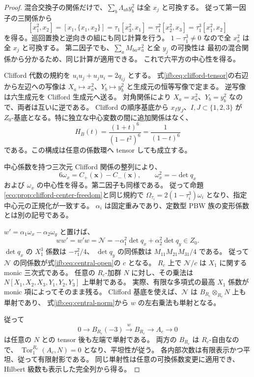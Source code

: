 \begin{proof}
混合交換子の関係だけで、$\sum_b\Lambda_{ab}y_b^2$ は全 $x_j$ と可換する。
従って第一因子の三関係から
\[
 [x_1^2,x_2]=[x_1,\{x_1,x_2\}]
    =\tau_1[x_3^2,x_1]
    =\tau_1^2[x_2^2,x_3]
    =\tau_1^3[x_1^2,x_2]
\]
を得る。巡回置換と逆向きの組にも同じ計算を行う。
$1-\tau_1^3\ne0$ なので全 $x_a^2$ は全 $x_j$ と可換する。
第二因子でも、$\sum_aM_{ba}x_a^2$ と全 $y_j$ の可換性は
最初の混合関係から分かるため、同じ計算が適用できる。
これで六平方の中心性を得る。

Clifford 代数の規約を $u_i u_j+u_j u_i=2q_{ij}$ とする。
式\eqref{ifb:eq:clifford-tensor}の右辺から左辺への写像は
$X_a\mapsto x_a^2$、$Y_b\mapsto y_b^2$ と生成元の恒等写像で定まる。
逆写像は六生成元を Clifford 生成元へ送る。
対角関係により $X_a=x_a^2$、$Y_b=y_b^2$ なので、両者は互いに逆である。
Clifford の順序基底から $x_Iy_J$、$I,J\subset\{1,2,3\}$ が
$Z_0$-基底となる。特に独立な中心変数の間に追加関係はなく、
\[
 H_B(t)=\frac{(1+t)^6}{(1-t^2)^6}=\frac1{(1-t)^6}
\]
である。この構成は任意の係数環へ tensor しても成立する。

中心係数を持つ三次元 Clifford 関係の整列により、
\[
 6\omega_x=C_+(\mathbf x)-C_-(\mathbf x),\qquad
 \omega_x^2=-\det q_x
\]
および $\omega_x$ の中心性を得る。第二因子も同様である。
従って命題\ref{eco:prop:clifford-center-freedom}と同じ規約で
$\Omega_{\tau_i}=2(1-\tau_i^3)\omega_i$ となり、指定中心元の正規化が一致する。
$\alpha_i$ は固定重みであり、定数型 PBW 族の変形係数とは別の記号である。

$w'=\alpha_1\omega_x-\alpha_2\omega_y$ と置けば、
\begin{equation}\label{ifb:eq:central-norm}
 ww'=w'w=\mathcal N=-\alpha_1^2\det q_x+\alpha_2^2\det q_y\in Z_0.
\end{equation}
$\det q_x$ の $X_1^3$ 係数は $-\tau_1^2/4$、
$\det q_y$ の同係数は $M_{11}M_{21}M_{31}/4$ である。
従って $\mathcal N$ の同係数が式\eqref{ifb:eq:central-open}の $c$ となる。
$R_c$ 上で $\mathcal N/c$ は $X_1$ に関する monic 三次式である。
任意の $R_c$-加群 $N$ に対し、その乗法は
$N[X_1,X_2,X_3,Y_1,Y_2,Y_3]$ 上単射である。
実際、有限な多項式の最高 $X_1$ 係数が monic 項によってそのまま残る。
Clifford 基底を使えば、$\mathcal N$ は $B_{R_c}\otimes_{R_c}N$ 上も単射であり、
式\eqref{ifb:eq:central-norm}から $w$ の左右乗法も単射となる。

従って
\[
 0\longrightarrow B_{R_c}(-3)\xrightarrow{w}B_{R_c}
             \longrightarrow A_c\longrightarrow0
\]
は任意の $N$ との tensor 後も左端で単射である。
両方の $B_{R_c}$ は $R_c$-自由なので、
$\operatorname{Tor}^{R_c}_1(A_c,N)=0$ となり、平坦性が従う。
各内部次数は有限表示かつ平坦、従って有限射影である。
同じ単射性は任意の可換係数変更に適用でき、Hilbert 級数も表示した完全列から得る。
\end{proof}

